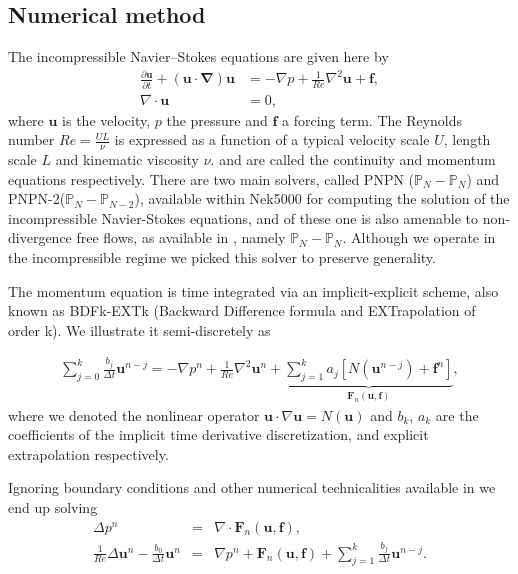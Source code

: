 \documentclass{sig-alternate}
\begin{document}
\subsection{Numerical method}
\label{sec:method}
The incompressible Navier--Stokes equations are given here by
\begin{align} 
 \frac{\partial \mathbf{u}}{\partial t} + (\mathbf{u \cdot \nabla}) \mathbf{u} & = - \nabla p + \frac{1}{Re} \nabla^2 \mathbf{u} + \mathbf{f} \label{eqn:NS_momentum},\\
 \nabla \cdot \mathbf{u} & = 0, \label{eqn:NS_continuity}
\end{align}
where $\mathbf{u}$ is the velocity, $p$ the pressure and $\mathbf{f}$ a forcing 
term. The Reynolds number 
$Re = \frac{U L}{\nu}$ is expressed as a function of a typical velocity scale $U$,
length scale $L$ and kinematic viscosity $\nu$.  
and  are called the continuity and momentum equations 
respectively. There are two main solvers, called PNPN ($\mathbb{P}_N-\mathbb{P}_N$) and PNPN-2($\mathbb{P}_N-\mathbb{P}_{N-2}$), available within 
Nek5000 for computing the solution of the incompressible 
Navier-Stokes equations, and of these one is also amenable to non-divergence free 
flows, as available in \cite{Tomboulides1997}, namely $\mathbb{P}_N-\mathbb{P}_N$. Although we operate in the incompressible
regime we picked this solver to preserve generality. 

The momentum equation is time integrated via an implicit-explicit scheme, also
known as BDFk-EXTk (Backward Difference formula and EXTrapolation of order k). We
illustrate it semi-discretely as

\begin{eqnarray}
\sum\limits_{j=0}^k \frac{b_j}{\Delta t} \mathbf u^{n-j}  = - \nabla p^{n}+\frac{1}{Re}\nabla^2\mathbf u^{n}+\underbrace{\sum\limits_{j=1}^k a_j [N(\mathbf u^{n-j})+\mathbf f^{n}]}_{\mathbf{F}_n(\mathbf u,\mathbf f)},\label{eqn:discrete}
\end{eqnarray}
where we denoted the nonlinear operator $\mathbf u \cdot \nabla \mathbf u=N(\mathbf u)$ and $b_k$, $a_k$ are the coefficients of the implicit time derivative discretization, and explicit extrapolation respectively.

Ignoring boundary conditions and other numerical technicalities available in \cite{Tomboulides1997} we end up solving
\begin{eqnarray}
 \Delta p^{n} &= &\nabla \cdot  \mathbf{F}_n \left( \mathbf{u},\mathbf f \right), \label{eqn:hmhz_pres}\\
 \frac{1}{Re}\Delta \mathbf{u}^{n}- \frac{b_0}{\Delta t} \mathbf{u}^{n} & = & \nabla p^{n} + \mathbf{F}_n ( \mathbf{u}, \mathbf f)  +\sum\limits_{j=1}^k \frac{b_j}{\Delta t} \mathbf u^{n-j} . \label{eqn:hmhz_vel}
\end{eqnarray}
\end{document}
